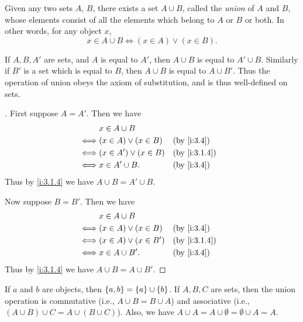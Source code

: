 \begin{ax}\label{i:3.4}
  Given any two sets \(A\), \(B\), there exists a set \(A \cup B\), called the \emph{union} of \(A\) and \(B\), whose elements consist of all the elements which belong to \(A\) or \(B\) or both.
  In other words, for any object \(x\),
  \[
    x \in A \cup B \iff (x \in A) \lor (x \in B).
  \]
\end{ax}

\setcounter{thm}{11}
\begin{rmk}\label{i:3.1.12}
  If \(A, B, A'\) are sets, and \(A\) is equal to \(A'\), then \(A \cup B\) is equal to \(A' \cup B\).
  Similarly if \(B'\) is a set which is equal to \(B\), then \(A \cup B\) is equal to \(A \cup B'\).
  Thus the operation of union obeys the axiom of substitution, and is thus well-defined on sets.
\end{rmk}

\begin{proof}[]
  First suppose \(A = A'\).
  Then we have
  \begin{align*}
         & x \in A \cup B                              \\
    \iff & (x \in A) \lor (x \in B)  &  & \by{i:3.4}   \\
    \iff & (x \in A') \lor (x \in B) &  & \by{i:3.1.4} \\
    \iff & x \in A' \cup B.          &  & \by{i:3.4}
  \end{align*}
  Thus by \cref{i:3.1.4} we have \(A \cup B = A' \cup B\).

  Now suppose \(B = B'\).
  Then we have
  \begin{align*}
         & x \in A \cup B                              \\
    \iff & (x \in A) \lor (x \in B)  &  & \by{i:3.4}   \\
    \iff & (x \in A) \lor (x \in B') &  & \by{i:3.1.4} \\
    \iff & x \in A \cup B'.          &  & \by{i:3.4}
  \end{align*}
  Thus by \cref{i:3.1.4} we have \(A \cup B = A \cup B'\).
\end{proof}

\begin{lem}\label{i:3.1.13}
  If \(a\) and \(b\) are objects, then \(\left\lbrace a, b\right\rbrace = \left\lbrace a\right\rbrace \cup \left\lbrace b\right\rbrace\).
  If \(A, B, C\) are sets, then the union operation is commutative (i.e., \(A \cup B = B \cup A\)) and associative (i.e., \((A \cup B) \cup C = A \cup (B \cup C)\)).
  Also, we have \(A \cup A = A \cup \emptyset = \emptyset \cup A = A\).
\end{lem}

